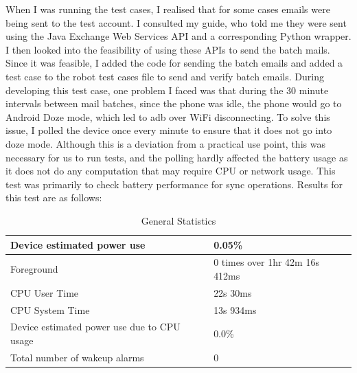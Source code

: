 When I was running the test cases, I realised that for some cases emails were being sent to the test account. I consulted my guide, who told me they were sent using the Java Exchange Web Services API and a corresponding Python wrapper. I then looked into the feasibility of using these APIs to send the batch mails. Since it was feasible, I added the code for sending the batch emails and added a test case to the robot test cases file to send and verify batch emails. During developing this test case, one problem I faced was that during the 30 minute intervals between mail batches, since the phone was idle, the phone would go to Android Doze mode, which led to adb over WiFi disconnecting. To solve this issue, I polled the device once every minute to ensure that it does not go into doze mode. Although this is a deviation from a practical use point, this was necessary for us to run tests, and the polling hardly affected the battery usage as it does not do any computation that may require CPU or network usage. This test was primarily to check battery performance for sync operations. Results for this test are as follows:

\begin{table}[!h]
\begin{center}
\caption{General Statistics}
\begin{tabular}{|P{8cm}|P{6.5cm}|}
\hline
Device estimated power use                  & 0.05\%                      \\ \hline
Foreground                                  & 0 times over 1hr 42m 16s 412ms \\ \hline
CPU User Time                               & 22s 30ms                 \\ \hline
CPU System Time                             & 13s 934ms                \\ \hline
Device estimated power use due to CPU usage & 0.0\%                       \\ \hline
Total number of wakeup alarms               & 0     \\    \hline                
\end{tabular}
\end{center}
\end{table}

